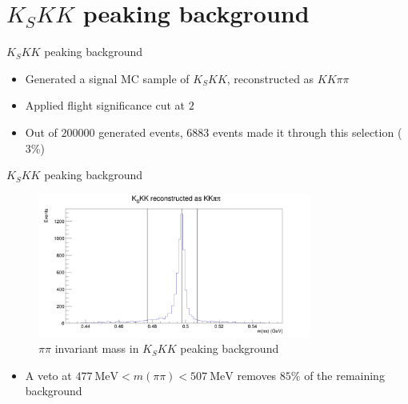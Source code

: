 \documentclass{beamer}
\begin{document}
\section{$K_SKK$ peaking background}
\begin{frame}{$K_SKK$ peaking background}
  \begin{itemize}
    \setlength\itemsep{2em}
    \item{Generated a signal MC sample of $K_SKK$, reconstructed as $KK\pi\pi$}
    \item{Applied flight significance cut at $2$}
    \item{Out of $200000$ generated events, $6883$ events made it through this selection ($3\%$)}
  \end{itemize}
\end{frame}

\begin{frame}{$K_SKK$ peaking background}
  \begin{figure}
    \centering
    \includegraphics[width=0.8\textwidth]{MpipiVeto.png}
    \caption{$\pi\pi$ invariant mass in $K_SKK$ peaking background}
  \end{figure}
  \begin{itemize}
    \item{A veto at $\SI{477}{\mega\eV} < m(\pi\pi) < \SI{507}{\mega\eV}$ removes $85\%$ of the remaining background}
  \end{itemize}
\end{frame}
\end{document}
